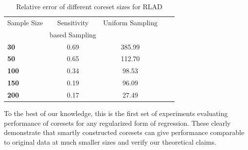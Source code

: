 \begin{table}[t]
\caption{Relative error of different coreset sizes for RLAD}
\label{Table 3}
\vskip 0.15in
\begin{center}
\begin{small}
\begin{sc}
\begin{tabular}{lcccr}
\toprule
Sample Size & Sensitivity  & Uniform Sampling \\
& based Sampling & \\
\midrule
\textbf{30}  & 0.69 & 385.99\\
\textbf{50}  & 0.65 & 112.70 \\
\textbf{100} & 0.34 & 98.53 \\
\textbf{150} & 0.19 & 96.09  \\
\textbf{200} & 0.17 & 27.49\\
\bottomrule
\end{tabular}
\end{sc}
\end{small}
\end{center}
\vskip -0.1in
\end{table}
To the best of our knowledge, this is the first set of experiments evaluating performance of coresets for any regularized form of regression. These clearly demonstrate that smartly constructed coresets can give performance comparable to original data at much smaller sizes and verify our theoretical claims. 